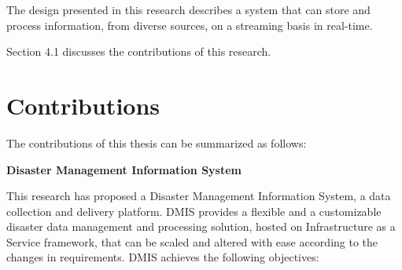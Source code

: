 The design presented in this research describes a system that can store and process information, from diverse sources, on a streaming basis in real-time.

Section 4.1 discusses the contributions of this research.

\section{Contributions}

The contributions of this thesis can be summarized as follows:

\begin{flushleft}
	\textbf{Disaster Management Information System}
\end{flushleft}

This research has proposed a Disaster Management Information System, a data collection and delivery platform. DMIS provides a flexible and a customizable disaster data management and processing solution, hosted on Infrastructure as a Service framework, that can be scaled and altered with ease according to the changes in requirements. DMIS achieves the following objectives:

